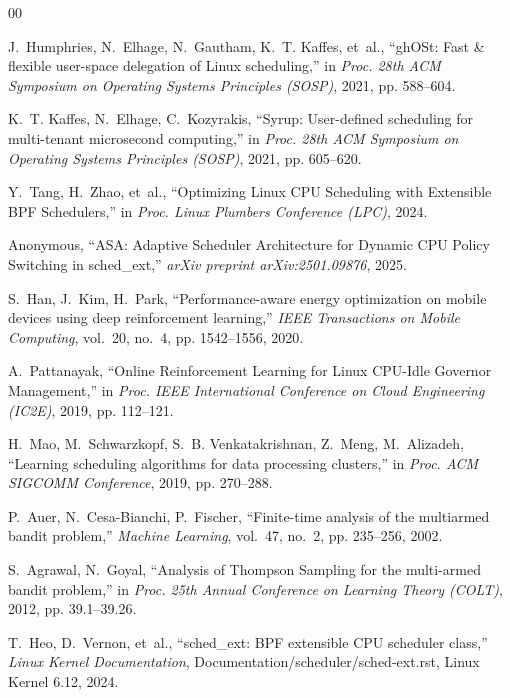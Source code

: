 \documentclass[journal]{IEEEtran}
\begin{document}
\begin{thebibliography}{00}

J.~Humphries, N.~Elhage, N.~Gautham, K.~T. Kaffes, et~al., ``ghOSt: Fast \& flexible user-space delegation of Linux scheduling,'' in \emph{Proc. 28th ACM Symposium on Operating Systems Principles (SOSP)}, 2021, pp. 588--604.

K.~T. Kaffes, N.~Elhage, C.~Kozyrakis, ``Syrup: User-defined scheduling for multi-tenant microsecond computing,'' in \emph{Proc. 28th ACM Symposium on Operating Systems Principles (SOSP)}, 2021, pp. 605--620.

Y.~Tang, H.~Zhao, et~al., ``Optimizing Linux CPU Scheduling with Extensible BPF Schedulers,'' in \emph{Proc. Linux Plumbers Conference (LPC)}, 2024.

Anonymous, ``ASA: Adaptive Scheduler Architecture for Dynamic CPU Policy Switching in sched\_ext,'' \emph{arXiv preprint arXiv:2501.09876}, 2025.

S.~Han, J.~Kim, H.~Park, ``Performance-aware energy optimization on mobile devices using deep reinforcement learning,'' \emph{IEEE Transactions on Mobile Computing}, vol.~20, no.~4, pp. 1542--1556, 2020.

A.~Pattanayak, ``Online Reinforcement Learning for Linux CPU-Idle Governor Management,'' in \emph{Proc. IEEE International Conference on Cloud Engineering (IC2E)}, 2019, pp. 112--121.

H.~Mao, M.~Schwarzkopf, S.~B. Venkatakrishnan, Z.~Meng, M.~Alizadeh, ``Learning scheduling algorithms for data processing clusters,'' in \emph{Proc. ACM SIGCOMM Conference}, 2019, pp. 270--288.

P.~Auer, N.~Cesa-Bianchi, P.~Fischer, ``Finite-time analysis of the multiarmed bandit problem,'' \emph{Machine Learning}, vol.~47, no.~2, pp. 235--256, 2002.

S.~Agrawal, N.~Goyal, ``Analysis of Thompson Sampling for the multi-armed bandit problem,'' in \emph{Proc. 25th Annual Conference on Learning Theory (COLT)}, 2012, pp. 39.1--39.26.

T.~Heo, D.~Vernon, et~al., ``sched\_ext: BPF extensible CPU scheduler class,'' \emph{Linux Kernel Documentation}, Documentation/scheduler/sched-ext.rst, Linux Kernel 6.12, 2024.

\end{thebibliography}
\end{document}

